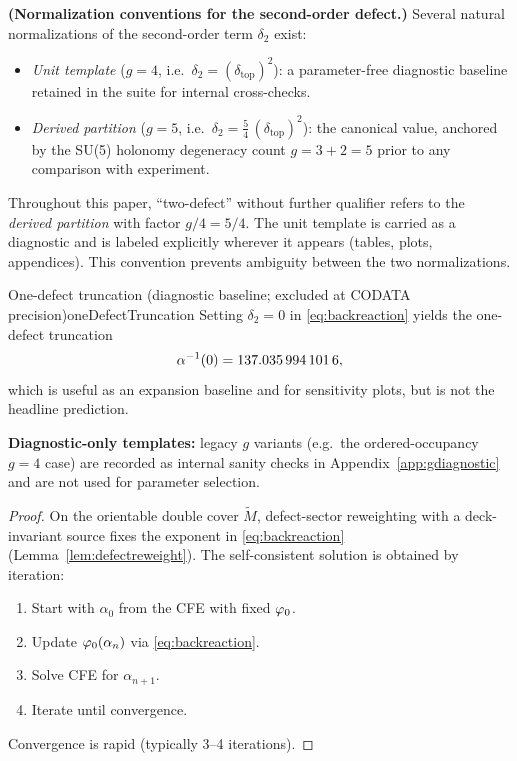 \begin{remark}
\label{rem:two-defect-conventions}
\textbf{(Normalization conventions for the second-order defect.)}
Several natural normalizations of the second-order term $\delta_2$ exist:
\begin{itemize}[leftmargin=1.5em, topsep=2pt, itemsep=1pt]
    \item \emph{Unit template} ($g=4$, i.e.\ $\delta_2=(\delta_{\mathrm{top}})^2$): a parameter-free diagnostic baseline retained in the suite for internal cross-checks.
    \item \emph{Derived partition} ($g=5$, i.e.\ $\delta_2=\tfrac54\,(\delta_{\mathrm{top}})^2$): the canonical value, anchored by the SU(5) holonomy degeneracy count $g=3+2=5$ prior to any comparison with experiment.
\end{itemize}
Throughout this paper, ``two-defect'' without further qualifier refers to the \emph{derived partition} with factor $g/4=5/4$.
The unit template is carried as a diagnostic and is labeled explicitly wherever it appears (tables, plots, appendices).
This convention prevents ambiguity between the two normalizations.
\end{remark}

\begin{lemma}{One-defect truncation (diagnostic baseline; excluded at CODATA precision)}{oneDefectTruncation}
Setting $\delta_2=0$ in \eqref{eq:backreaction} yields the one-defect truncation
\[
\alpha^{-1}(0)=\num[round-mode=places,round-precision=10]{\TFPTalphaInvSelfNum},
\]
which is useful as an expansion baseline and for sensitivity plots, but is not the headline prediction.
\end{lemma}

\begin{remark}
\textbf{Diagnostic-only templates:} legacy $g$ variants (e.g.\ the ordered-occupancy $g=4$ case) are
recorded as internal sanity checks in Appendix~\ref{app:gdiagnostic} and are not used for
parameter selection.
\end{remark}

\begin{proof}
On the orientable double cover $\widetilde{M}$, defect-sector reweighting with a
deck-invariant source fixes the exponent in \eqref{eq:backreaction}
(Lemma~\ref{lem:defectreweight}). The self-consistent solution is obtained by iteration:
\begin{enumerate}
    \item Start with $\alpha_0$ from the CFE with fixed $\varphi_0$.
    \item Update $\varphi_0(\alpha_n)$ via \eqref{eq:backreaction}.
    \item Solve CFE for $\alpha_{n+1}$.
    \item Iterate until convergence.
\end{enumerate}
Convergence is rapid (typically 3--4 iterations).
\end{proof}

